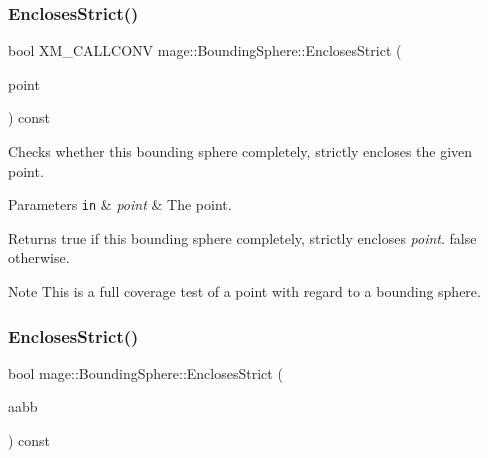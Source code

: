 \subsubsection{\texorpdfstring{Encloses\+Strict()}{EnclosesStrict()}\hspace{0.1cm}{\footnotesize\ttfamily [2/4]}}
{\footnotesize\ttfamily bool X\+M\+\_\+\+C\+A\+L\+L\+C\+O\+NV mage\+::\+Bounding\+Sphere\+::\+Encloses\+Strict (\begin{DoxyParamCaption}\item[{F\+X\+M\+V\+E\+C\+T\+OR}]{point }\end{DoxyParamCaption}) const\hspace{0.3cm}{\ttfamily [noexcept]}}

Checks whether this bounding sphere completely, strictly encloses the given point.


\begin{DoxyParams}[1]{Parameters}
\mbox{\tt in}  & {\em point} & The point. \\
\hline
\end{DoxyParams}
\begin{DoxyReturn}{Returns}
{\ttfamily true} if this bounding sphere completely, strictly encloses {\itshape point}. {\ttfamily false} otherwise. 
\end{DoxyReturn}
\begin{DoxyNote}{Note}
This is a full coverage test of a point with regard to a bounding sphere. 
\end{DoxyNote}
\hypertarget{classmage_1_1_bounding_sphere_ac1598f0dcef439855f203fbd6357e6f7}{}\label{classmage_1_1_bounding_sphere_ac1598f0dcef439855f203fbd6357e6f7} 
\subsubsection{\texorpdfstring{Encloses\+Strict()}{EnclosesStrict()}\hspace{0.1cm}{\footnotesize\ttfamily [3/4]}}
{\footnotesize\ttfamily bool mage\+::\+Bounding\+Sphere\+::\+Encloses\+Strict (\begin{DoxyParamCaption}\item[{const \hyperlink{classmage_1_1_a_a_b_b}{A\+A\+BB} \&}]{aabb }\end{DoxyParamCaption}) const\hspace{0.3cm}{\ttfamily [noexcept]}}

